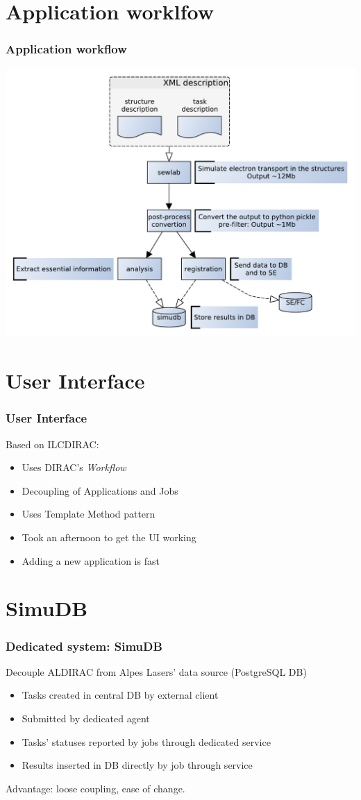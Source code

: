 \documentclass[14pt]{beamer}
\begin{document}
\section{Application worklfow}
\begin{frame}
\frametitle{Application workflow}
\centering
\includegraphics[width=\textwidth]{sewlabworkflow}
\end{frame}

\section{User Interface}
\begin{frame}
\frametitle{User Interface}
Based on ILCDIRAC:
\begin{itemize}
\setlength{\itemindent}{-1.2em}
\item Uses DIRAC's \emph{Workflow}
\item Decoupling of Applications and Jobs
\item Uses \alert{Template Method} pattern
\item Took an afternoon to get the UI working
\item Adding a new application is fast
\end{itemize}
\end{frame}

\section{SimuDB}
\begin{frame}
\frametitle{Dedicated system: SimuDB}
{\color{blue}Decouple ALDIRAC from Alpes Lasers' data source} (PostgreSQL DB)
\begin{itemize}
\setlength{\itemindent}{-1.2em}
\item Tasks created in central DB by {\color{blue}external client}
\item Submitted by \alert{dedicated agent} 
\item Tasks' statuses reported by jobs through \alert{dedicated service}
\item \alert{Results inserted in DB directly} by job through service
\end{itemize}
Advantage: loose coupling, ease of change.
\end{frame}
\end{document}
